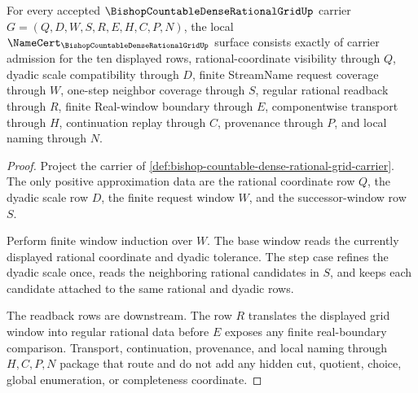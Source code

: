 \begin{theorem}
\label{thm:bishop-countable-dense-rational-grid-namecert-obligations}
For every accepted $\BishopCountableDenseRationalGridUp$ carrier $G=(Q,D,W,S,R,E,H,C,P,N)$, the local $\NameCert_{\BishopCountableDenseRationalGridUp}$ surface consists exactly of carrier admission for the ten displayed rows, rational-coordinate visibility through $Q$, dyadic scale compatibility through $D$, finite StreamName request coverage through $W$, one-step neighbor coverage through $S$, regular rational readback through $R$, finite Real-window boundary through $E$, componentwise transport through $H$, continuation replay through $C$, provenance through $P$, and local naming through $N$.
\end{theorem}
\begin{proof}
Project the carrier of \autoref{def:bishop-countable-dense-rational-grid-carrier}. The only positive approximation data are the rational coordinate row $Q$, the dyadic scale row $D$, the finite request window $W$, and the successor-window row $S$.

Perform finite window induction over $W$. The base window reads the currently displayed rational coordinate and dyadic tolerance. The step case refines the dyadic scale once, reads the neighboring rational candidates in $S$, and keeps each candidate attached to the same rational and dyadic rows.

The readback rows are downstream. The row $R$ translates the displayed grid window into regular rational data before $E$ exposes any finite real-boundary comparison. Transport, continuation, provenance, and local naming through $H,C,P,N$ package that route and do not add any hidden cut, quotient, choice, global enumeration, or completeness coordinate.
\end{proof}

